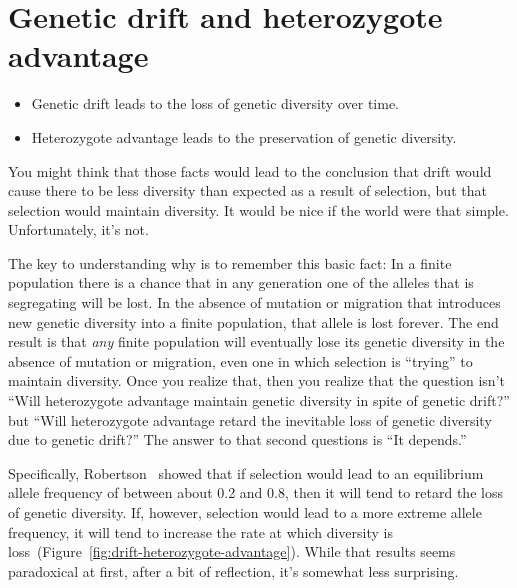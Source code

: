 \documentclass[12pt]{article}
\begin{document}
\section*{Genetic drift and heterozygote advantage}

\begin{itemize}

\item Genetic drift leads to the loss of genetic diversity over time. 

\item Heterozygote advantage leads to the preservation of genetic diversity.

\end{itemize}

You might think that those facts would lead to the conclusion that
drift would cause there to be less diversity than expected as a result
of selection, but that selection would maintain diversity. It would be
nice if the world were that simple. Unfortunately, it's not. 

The key to understanding why is to remember this basic fact: In a
finite population there is a chance that in any generation one of the
alleles that is segregating will be lost. In the absence of mutation
or migration that introduces new genetic diversity into a finite
population, that allele is lost forever. The end result is that {\it
  any\/} finite population will eventually lose its genetic diversity
in the absence of mutation or migration, even one in which selection
is ``trying'' to maintain diversity. Once you realize that, then you
realize that the question isn't ``Will heterozygote advantage maintain
genetic diversity in spite of genetic drift?'' but ``Will heterozygote
advantage retard the inevitable loss of genetic diversity due to
genetic drift?'' The answer to that second questions is ``It depends.''

Specifically, Robertson~\cite{Robertson-1962} showed that if selection
would lead to an equilibrium allele frequency of between about 0.2 and
0.8, then it will tend to retard the loss of genetic diversity. If,
however, selection would lead to a more extreme allele frequency, it
will tend to increase the rate at which diversity is
loss~(Figure~\ref{fig:drift-heterozygote-advantage}). While that
results seems paradoxical at first, after a bit of reflection, it's
somewhat less surprising.
\end{document}
